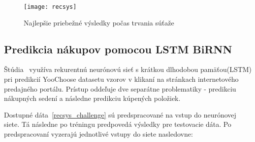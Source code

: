 \begin{figure}[H]
	\begin{center}
		\texttt{[image: recsys]}\end{center}
	\caption[recsys]{Najlepšie priebežné výsledky počas trvania súťaže~\cite{ben2015recsys}}
	\label{fig:recsys}
\end{figure}


\subsection{Predikcia nákupov pomocou LSTM BiRNN}
\label{yoochoose_lstm}

Štúdia~\cite{wu2015neural} využíva rekurentnú neurónovú sieť s krátkou dlhodobou pamäťou(LSTM) pri predikcií YooChoose datasetu vzorov v klikaní na stránkach internetového predajného portálu. Prístup oddeľuje dve separátne problematiky - predikciu nákupných sedení a následne predikciu kúpených položiek. 

Dostupné dáta~\ref{recsys_challenge} sú predspracované na vstup do neurónovej siete. Tá následne po tréningu predpovedá výsledky pre testovacie dáta. Po predspracovaní vyzerajú jednotlivé vstupy do siete nasledovne:\newline
\linebreak



